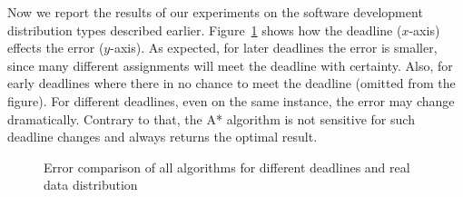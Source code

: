 \documentclass[letterpaper]{article} %
\newcommand{\astar}{\textsc{A*}\xspace}
\newcommand{\sampling}{\textsc{Sampling}\xspace}
\newcommand{\expectation}{\textsc{Expectation}\xspace}
\newcommand\Roni[1]{\nb{\textbf{Roni:}}{blue}{#1}}
\begin{document}
Now we report the results of our experiments on the software development distribution types described earlier. 
Figure~\ref{allDDRealError} shows how the deadline ($x$-axis) effects the error ($y$-axis). 
As expected, for later deadlines the error is smaller, since many different assignments will meet the deadline with certainty. Also, for early deadlines where there in no chance to meet the deadline (omitted from the figure). For different deadlines, even on the same instance, the error may change dramatically. Contrary to that, the \astar algorithm is not sensitive for such deadline changes and always returns the optimal result. 


\begin{figure}[h!]
	\scriptsize	
	\caption{Error comparison of all algorithms for different deadlines and real data distribution}\label{allDDRealError}
\end{figure}	
	
\end{document}
